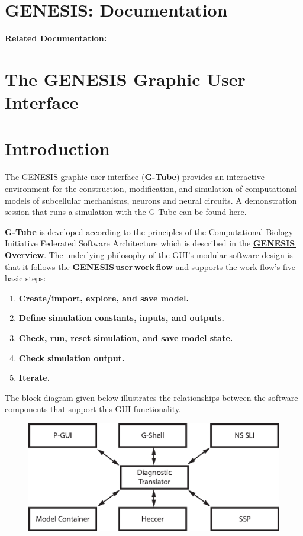 \documentclass[12pt]{article}
\begin{document}
\section*{GENESIS: Documentation}

{\bf Related Documentation:}

\section*{The GENESIS Graphic User Interface}

\section*{Introduction}

The GENESIS graphic user interface ({\bf G-Tube}) provides an
interactive environment for the construction, modification, and
simulation of computational models of subcellular mechanisms, neurons
and neural circuits.  A demonstration session that runs a simulation
with the G-Tube can be found \href{../gtube-demo/gtube-demo.html}{here}.

{\bf G-Tube} is developed according to the principles of the Computational Biology Initiative Federated Software Architecture which is described in the \href{../genesis-overview/genesis-overview.tex}{\bf GENESIS\,Overview}. The underlying philosophy of the GUI's modular software design is that it follows the \href{../workflow-intro/workflow-intro.tex}{\bf GENESIS\,user\,work\,flow} and supports the work flow's five basic steps:
\begin{enumerate}
\item {\bf Create/import, explore, and save model.}
\item {\bf Define simulation constants, inputs, and outputs.}
\item {\bf Check, run, reset simulation, and save model state.}
\item {\bf Check simulation output.}
\item {\bf Iterate.}
\end{enumerate}
The block diagram given below illustrates the relationships between the software components that support this GUI functionality.

\begin{figure}[h]
  \centering
\includegraphics[scale=0.6]{figures/gui-isolated.eps}
  \label{fig:df-1}
\end{figure}
\end{document}
